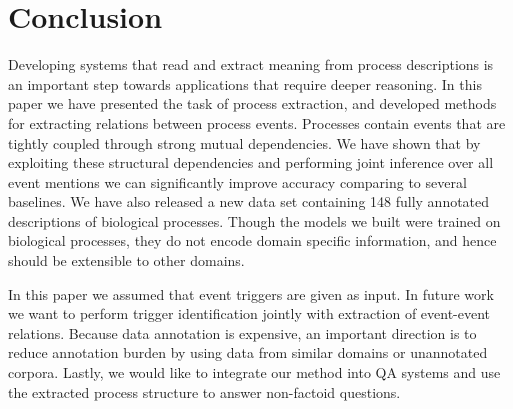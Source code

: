 \section{Conclusion}

Developing systems that read and extract meaning from process descriptions is an important step towards applications that require deeper reasoning. In this paper we have presented the task of process extraction, and developed methods for extracting relations between process events. Processes contain events that are  tightly coupled through strong mutual dependencies. We have shown that by exploiting these structural dependencies and performing joint inference over all event mentions we can significantly improve accuracy comparing to several baselines. We have also released a new data set containing 148 fully annotated descriptions of biological processes. Though the models we built were trained on biological processes, they do not encode domain specific information, and hence should be extensible to other domains.

In this paper we assumed that event triggers are given as input. In future work we want to perform trigger identification jointly with extraction of event-event relations. Because data annotation is expensive, an important direction is to reduce annotation burden by using data from similar domains or unannotated corpora. Lastly, we would like to integrate our method into QA systems and use the extracted process structure to answer non-factoid questions. 
